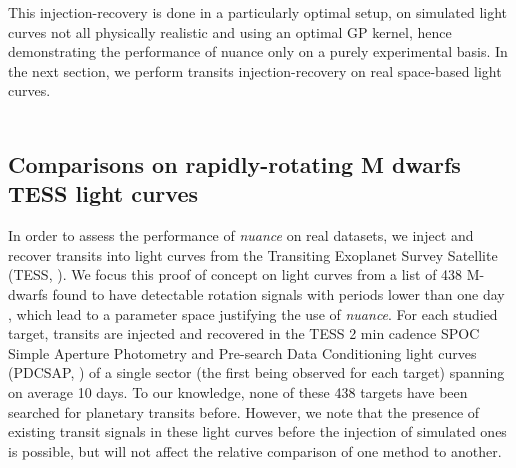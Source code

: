 \documentclass[modern]{aastex631}
\newcommand{\nuancemethod}{\textit{nuance}}
\newcommand{\nuance}{\nuancemethod{}}
\begin{document}
\noindent This injection-recovery is done in a particularly optimal setup, on simulated light curves not all physically realistic and using an optimal GP kernel, hence demonstrating the performance of \textsf{nuance} only on a purely experimental basis. In the next section, we perform transits injection-recovery on real space-based light curves.\\\\
\subsection{Comparisons on rapidly-rotating M dwarfs TESS light curves}\label{real}



In order to assess the performance of \nuance{} on real datasets, we inject and recover transits into light curves from the Transiting Exoplanet Survey Satellite (TESS, \citealt{tess}). We focus this proof of concept on light curves from a list of 438 M-dwarfs found to have detectable rotation signals with periods lower than one day \citep{Ramsay2020}, which lead to a parameter space justifying the use of \nuance{}. For each studied target, transits are injected and recovered in the TESS 2 min cadence SPOC Simple Aperture Photometry and Pre-search Data Conditioning light curves (PDCSAP, \citealt{spoc}) of a single sector (the first being observed for each target) spanning on average 10 days. To our knowledge, none of these 438 targets have been searched for planetary transits before. However, we note that the presence of existing transit signals in these light curves before the injection of simulated ones is possible, but will not affect the relative comparison of one method to another.\\\\
\end{document}
